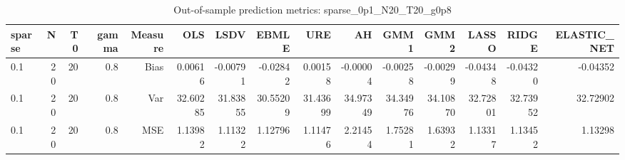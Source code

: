 \begin{table}[!htbp]\centering
\caption{Out-of-sample prediction metrics: sparse_0p1_N20_T20_g0p8}
\label{tab:table3_sparse_0p1_N20_T20_g0p8}
\begin{tabular}{lrrrrrrrrrrrrrr}
\hline
sparse & N & T0 & gamma & Measure & OLS & LSDV & EBMLE & URE & AH & GMM1 & GMM2 & LASSO & RIDGE & ELASTIC_NET \\
\hline
0.1 & 20 & 20 & 0.8 & Bias & 0.00616 & -0.00791 & -0.02842 & 0.00158 & -0.00004 & -0.00258 & -0.00299 & -0.04348 & -0.04320 & -0.04352 \\
0.1 & 20 & 20 & 0.8 & Var & 32.60285 & 31.83855 & 30.55209 & 31.43699 & 34.97349 & 34.34976 & 34.10870 & 32.72801 & 32.73952 & 32.72902 \\
0.1 & 20 & 20 & 0.8 & MSE & 1.13982 & 1.11322 & 1.12796 & 1.11476 & 2.21454 & 1.75281 & 1.63932 & 1.13317 & 1.13452 & 1.13298 \\
\hline
\end{tabular}
\end{table}

